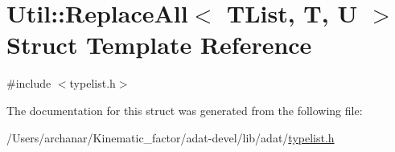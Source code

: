 \hypertarget{structUtil_1_1TL_1_1ReplaceAll}{}\section{Util\+:\+:Replace\+All$<$ T\+List, T, U $>$ Struct Template Reference}
\label{structUtil_1_1TL_1_1ReplaceAll}


{\ttfamily \#include $<$typelist.\+h$>$}



The documentation for this struct was generated from the following file\+:\begin{DoxyCompactItemize}
\item 
/\+Users/archanar/\+Kinematic\+\_\+factor/adat-\/devel/lib/adat/\mbox{\hyperlink{adat-devel_2lib_2adat_2typelist_8h}{typelist.\+h}}\end{DoxyCompactItemize}
